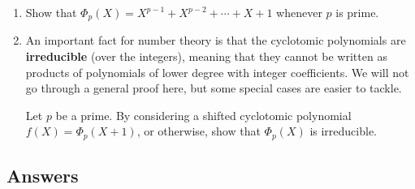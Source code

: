 \begin{enumerate}
\begin{enumerate}
\item Show that $\Phi_p(X) = X^{p - 1} + X^{p - 2} + \cdots + X + 1$ whenever $p$ is prime.
\item An important fact for number theory is that the cyclotomic polynomials are \textbf{irreducible} (over the integers), meaning that they cannot be written as products of polynomials of lower degree with integer coefficients. We will not go through a general proof here, but some special cases are easier to tackle.\par
Let $p$ be a prime. By considering a shifted cyclotomic polynomial $f(X) = \Phi_p(X + 1)$, or otherwise, show that $\Phi_p(X)$ is irreducible.
\end{enumerate}
\end{enumerate}


\newpage
\subsection{Answers}

